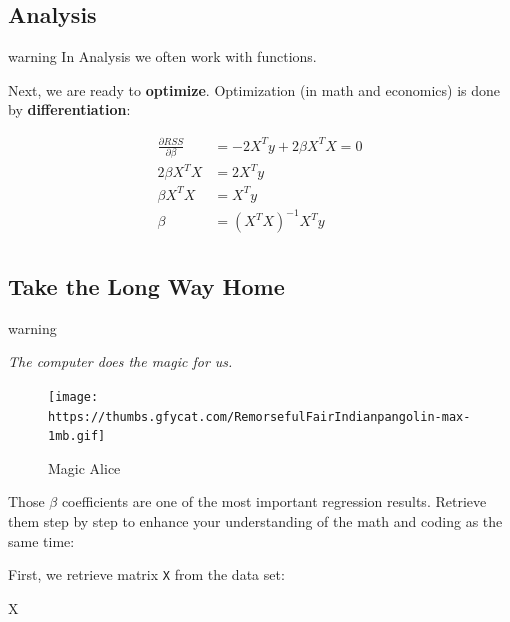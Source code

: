 \documentclass[
]{book}
\newenvironment{Shaded}{\begin{snugshade}}{\end{snugshade}}
\newcommand{\NormalTok}[1]{#1}
\begin{document}
\hypertarget{analysis}{%
\subsection{Analysis}\label{analysis}}

\begin{infobox}warning
In Analysis we often work with functions.

\end{infobox}

Next, we are ready to \textbf{optimize}. Optimization (in math and economics) is done by \textbf{differentiation}:

\[\begin{align}
    \frac{\partial RSS}{\partial \beta} &= -2 X^T y + 2 \beta X^T X = 0 \tag{first derivative equal to zero} \\
    2 \beta X^T X &= 2 X^T y \tag{rearrange terms}\\
    \beta X^T X &= X^T y \tag{the "normal equation"} \\
    \beta &= (X^T X)^{-1} X^T y \tag{Bam}\\
\end{align}\]

\hypertarget{take-the-long-way-home}{%
\subsection{Take the Long Way Home}\label{take-the-long-way-home}}

\begin{infobox}warning

\emph{The computer does the magic for us.}

\begin{figure}
\centering
\texttt{[image: https://thumbs.gfycat.com/RemorsefulFairIndianpangolin-max-1mb.gif]}
\caption{Magic Alice}
\end{figure}

\end{infobox}

Those \(\beta\) coefficients are one of the most important regression results. Retrieve them step by step to enhance your understanding of the math and coding as the same time:

First, we retrieve matrix \texttt{X} from the data set:

\begin{Shaded}
\begin{Highlighting}[]
\NormalTok{X}
\end{Highlighting}
\end{Shaded}
\end{document}
